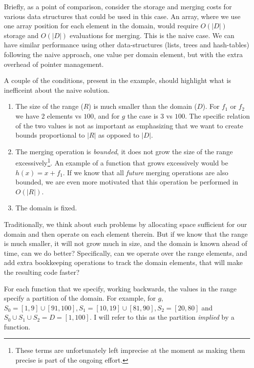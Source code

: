 \documentclass{article}
\begin{document}
Briefly, as a point of comparison,
consider the storage and merging costs for various data
structures that could be used in this case.
An array, where we use one array position for each element in the domain,
would require $O(|D|)$ storage and $O(|D|)$ evaluations for merging.
This is the naive case.
We can have similar performance using other data-structures
(lists, trees and hash-tables) following the naive approach,
one value per domain element,
but with the extra overhead of pointer management.

A couple of the conditions,
present in the example,
should highlight what is inefficeint about the naive solution.
\begin{enumerate}
  \item The size of the range ($R$) is much smaller than the domain ($D$).
    For $f_{1}$ or $f_{2}$ we have 2 elements vs $100$,
    and for $g$ the case is $3$ vs $100$.
    The specific relation of the two values is not as important as emphasizing
    that we want to create bounds proportional to $|R|$ as opposed to $|D|$.

  \item The merging operation is \emph{bounded},
    it does not grow the size of the range excessively\footnote{These terms are
    unfortunately left imprecise at the moment as making them precise is part of
    the ongoing effort.}.
    An example of a function that grows excessively would be $h(x) = x + f_{1}$.
    If we know that all \emph{future} merging operations are also bounded,
    we are even more motivated that this operation be performed in
    $O(|R|)$.

  \item The domain is fixed. 

\end{enumerate}

Traditionally,
we think about such problems by allocating space sufficient for our domain
and then operate on each element therein.
But if we know that the range is much smaller,
it will not grow much in size,
and the domain is known ahead of time,
can we do better?
Specifically,
can we operate over the range elements,
and add extra bookkeeping operations to track the domain elements,
that will make the resulting code faster?

For each function that we specify,
working backwards,
the values in the range specify a partition of the domain.
For example,
for $g$, $S_{0} = [1,9]\cup [91,100], S_{1} = [10,19] \cup [81,90], S_{2} = [20,80]$
and $S_{0} \cup S_{1} \cup S_{2} = D = [1,100]$.
I will refer to this as the partition \emph{implied} by a function.
\end{document}
